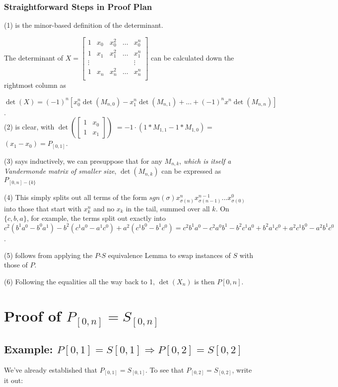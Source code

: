 \documentclass[11pt, oneside]{article} 	%
\begin{document}
\subsubsection{Straightforward Steps in Proof Plan}

(1) is the minor-based definition of the determinant.

The determinant of 
 $X = \begin{bmatrix}
1 & x_0 & x_0^2 & \ldots & x_0^{n} \\
1 & x_1 & x_1^2 & \ldots & x_1^{n} \\
\vdots & & & & \vdots  \\
1 & x_{n} & x_{n}^2 & \ldots & x_{n}^{n} \\
\end{bmatrix}
$ can be calculated down the rightmost column as

$\det(X) = (-1)^n [ x_0^n \det(M_{n,0}) - x_1^n \det(M_{n,1}) +  ... + (-1)^n x^n \det(M_{n,n})]$.
\\

(2) is clear, with 
$\det(\begin{bmatrix} 1 & x_0 \\ 1& x_1 \end{bmatrix})$
$= -1\cdot(1* M_{1, 1} - 1* M_{1,0}) = $
$(x_1 - x_0) = P_{[0,1]}$.

(3) says inductively, we can presuppose that  for any $M_{n, k}$, \emph{which is itself a Vandermonde matrix of smaller size}, $\det(M_{n,k})$ can be expressed as $P_{[0,n] - \{k\}}$

(4) This simply splits out all terms of the form $sgn(\sigma) x_{\sigma(n)}^{n} x_{\sigma(n-1)}^{n-1} ... x_{\sigma(0)}^{0}$ into those that start with $x_k^n$ and no $x_k$ in the tail, summed over all $k$.   On  $\{c,b,a\}$, for example, the terms split out exactly into $c^2(b^1a^0 - b^0a^1) - b^2(c^1a^0-a^1c^0) + a^2(c^1b^0-b^1c^0) = c^2b^1a^0 - c^2a^0b^1 - b^2c^1a^0 + b^2a^1c^0 + a^2c^1b^0 - a^2b^1c^0$.

(5) follows from applying the $P$-$S$ equivalence Lemma to swap instances of $S$ with those of $P$.

(6) Following the equalities all the way back to 1, $\det(X_n)$ is then $P[0,n]$.

\section{Proof of $P_{[0,n]} = S_{[0,n]}$}

\subsection{Example: $P{[0,1]} = S{[0,1]} \Rightarrow P{[0,2]} = S{[0,2]}$}
We've already established that $P_{[0,1]} = S_{[0,1]}$.  To see that $P_{[0,2]} = S_{[0,2]}$, write it out:
\end{document}
